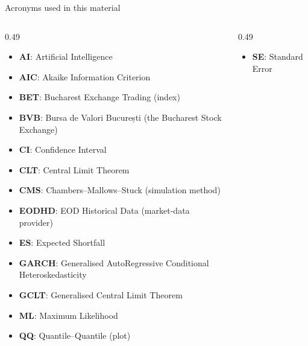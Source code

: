 {
\begin{frame}[noframenumbering]
    \titlepage
\end{frame}
}
\begin{frame}{Acronyms used in this material}
\begin{columns}[T]
\begin{column}{0.49\textwidth}
\begin{itemize}\setlength{\itemsep}{0pt}
    \item \textbf{AI}: Artificial Intelligence
    \item \textbf{AIC}: Akaike Information Criterion
    \item \textbf{BET}: Bucharest Exchange Trading (index)
    \item \textbf{BVB}: Bursa de Valori București (the Bucharest Stock Exchange)
    \item \textbf{CI}: Confidence Interval
    \item \textbf{CLT}: Central Limit Theorem
    \item \textbf{CMS}: Chambers–Mallows–Stuck (simulation method)
    \item \textbf{EODHD}: EOD Historical Data (market-data provider)
    \item \textbf{ES}: Expected Shortfall
    \item \textbf{GARCH}: Generalised AutoRegressive Conditional Heteroskedasticity
    \item \textbf{GCLT}: Generalised Central Limit Theorem
    \item \textbf{ML}: Maximum Likelihood
    \item \textbf{QQ}: Quantile–Quantile (plot)
\end{itemize}
\end{column}
\begin{column}{0.49\textwidth}
\begin{itemize}\setlength{\itemsep}{0pt}
    \item \textbf{SE}: Standard Error
\end{itemize}
\end{column}
\end{columns}
\end{frame}

